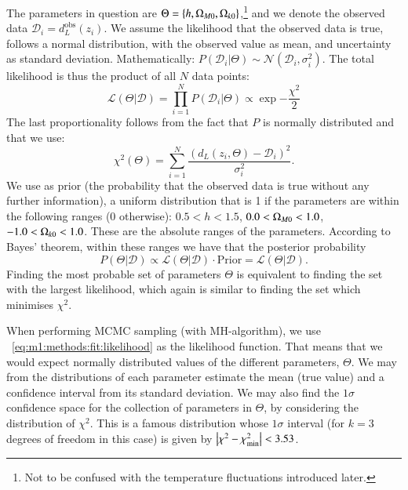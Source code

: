     The parameters in question are $\Theta = \{h, \Omega_{M0}, \Omega_{k0}\}$,\footnote{Not to be confused with the temperature fluctuations introduced later.} and we denote the observed data $\mathcal{D}_i = d_L^\mathrm{obs}(z_i)$.
    We assume the likelihood that the observed data is true, follows a normal distribution, with the observed value as mean, and uncertainty as standard deviation. Mathematically: $P(\mathcal{D}_i|\Theta) \sim \mathcal{N}(\mathcal{D}_i, \sigma_i^2)$. The total likelihood is thus the product of all $N$ data points:
    \begin{equation}\label{eq:m1:methods:fit:likelihood}
        \mathcal{L}(\Theta|\mathcal{D}) = \prod_{i=1}^NP(\mathcal{D}_i|\Theta) \propto \exp{-\frac{\chi^2}{2}}
    \end{equation}
    The last proportionality follows from the fact that $P$ is normally distributed and that we use:
    \begin{equation}\label{eq:m1:methods:fit:chi2}
        \chi^2(\Theta) = \sum_{i=1}^N\frac{(d_L(z_i, \Theta)-\mathcal{D}_i)^2}{\sigma_i^2}.
    \end{equation}
    We use as prior (the probability that the observed data is true without any further information), a uniform distribution that is 1 if the parameters are within the following ranges (0 otherwise): $0.5 < h < 1.5$, $0.0 < \Omega_{M0} < 1.0$, $-1.0 < \Omega_{k0} < 1.0$. These are the absolute ranges of the parameters. According to Bayes' theorem, within these ranges we have that the posterior probability 
    \begin{equation}\label{eq:m1:methods:fit:posterior_prob}
        P(\Theta|\mathcal{D}) \propto \mathcal{L}(\Theta|\mathcal{D}) \cdot \mathrm{Prior} = \mathcal{L}(\Theta|\mathcal{D}). 
    \end{equation}
    Finding the most probable set of parameters $\Theta$ is equivalent to finding the set with the largest likelihood, which again is similar to finding the set which minimises $\chi^2$. 

    When performing MCMC sampling (with MH-algorithm), we use ~\cref{eq:m1:methods:fit:likelihood} as the likelihood function. That means that we would expect normally distributed values of the different parameters, $\Theta$. We may from the distributions of each parameter estimate the mean (true value) and a confidence interval from its standard deviation. We may also find the $1\sigma$ confidence space for the collection of parameters in $\Theta$, by considering the distribution of $\chi^2$. This is a famous distribution whose $1\sigma$ interval (for $k=3$ degrees of freedom in this case) is given by $\abs{\chi^2-\chi^2_\mathrm{min}} < 3.53$. 
    
